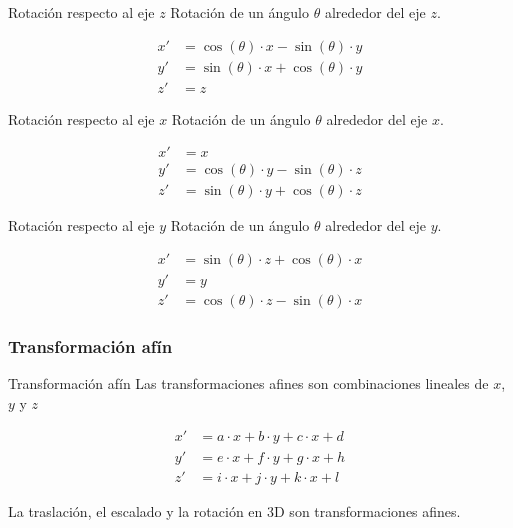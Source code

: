 \documentclass[a4paper, twoside]{article}
\begin{document}
\begin{definicion*}{Rotación respecto al eje $z$}
	Rotación de un ángulo $\theta$ alrededor del eje $z$.

	\begin{align*}
		x' &= \cos(\theta) \cdot x - \sin(\theta) \cdot y \\
		y' &= \sin(\theta) \cdot x + \cos(\theta) \cdot y \\
		z' &= z
	\end{align*}
\end{definicion*}

\begin{definicion*}{Rotación respecto al eje $x$}
	Rotación de un ángulo $\theta$ alrededor del eje $x$.

	\begin{align*}
		x' &= x \\
		y' &= \cos(\theta) \cdot y - \sin(\theta) \cdot z \\
		z' &= \sin(\theta) \cdot y + \cos(\theta) \cdot z
	\end{align*}
\end{definicion*}

\begin{definicion*}{Rotación respecto al eje $y$}
	Rotación de un ángulo $\theta$ alrededor del eje $y$.

	\begin{align*}
		x' &= \sin(\theta) \cdot z + \cos(\theta) \cdot x \\
		y' &= y \\
		z' &= \cos(\theta) \cdot z - \sin(\theta) \cdot x
	\end{align*}
\end{definicion*}

\subsubsection{Transformación afín}

\begin{definicion*}{Transformación afín}
	Las transformaciones afines son combinaciones lineales de $x$, $y$ y $z$

	\begin{align*}
		x' &= a \cdot x + b \cdot y + c \cdot x + d \\
		y' &= e \cdot x + f \cdot y + g \cdot x + h \\
		z' &= i \cdot x + j \cdot y + k \cdot x + l
	\end{align*}

	La traslación, el escalado y la rotación en 3D son transformaciones afines.
\end{definicion*}
\end{document}
